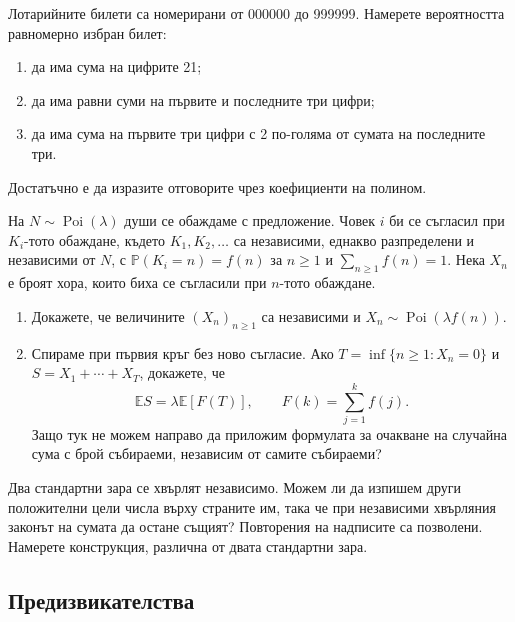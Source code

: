 \documentclass[11pt,a4paper]{article}
\newenvironment{enumeratea}{\begin{enumerate}[label=(\alph*),itemsep=0.28em,topsep=0.25em]}{\end{enumerate}}
\newcommand{\Pbb}{\mathbb P}
\newcommand{\Ebb}{\mathbb E}
\newcommand{\Poi}{\operatorname{Poi}}
\newcounter{problem}[section]
\begin{document}
\begin{problem}
Лотарийните билети са номерирани от 000000 до 999999.
Намерете вероятността равномерно избран билет:
\begin{enumeratea}
  \item да има сума на цифрите 21;
  \item да има равни суми на първите и последните три цифри;
  \item да има сума на първите три цифри с 2 по-голяма от сумата на последните три.
\end{enumeratea}
Достатъчно е да изразите отговорите чрез коефициенти на полином.
\end{problem}

\begin{problempencil}
На $N\sim\Poi(\lambda)$ души се обаждаме с предложение. Човек $i$ би се
съгласил при $K_i$-тото обаждане, където $K_1,K_2,\ldots$ са независими,
еднакво разпределени и независими от $N$, с
$\Pbb(K_i=n)=f(n)$ за $n\ge1$ и $\sum_{n\ge1}f(n)=1$.
Нека $X_n$ е броят хора, които биха се съгласили при $n$-тото обаждане.
\begin{enumeratea}
  \item Докажете, че величините $(X_n)_{n\ge1}$ са независими и
  $X_n\sim\Poi(\lambda f(n))$.
  \item Спираме при първия кръг без ново съгласие. Ако
  $T=\inf\{n\ge1:X_n=0\}$ и $S=X_1+\cdots+X_T$, докажете, че
  \[
  \Ebb S=\lambda\Ebb[F(T)],\qquad F(k)=\sum_{j=1}^k f(j).
  \]
  Защо тук не можем направо да приложим формулата за очакване на случайна сума
  с брой събираеми, независим от самите събираеми?
\end{enumeratea}
\end{problempencil}

\begin{problempencil}
Два стандартни зара се хвърлят независимо. Можем ли да изпишем други
положителни цели числа върху страните им, така че при независими хвърляния
законът на сумата да остане същият? Повторения на надписите са позволени.
Намерете конструкция, различна от двата стандартни зара.
\end{problempencil}

\subsection*{Предизвикателства}
\end{document}
